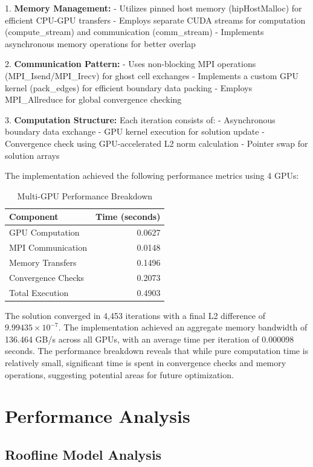 \documentclass{article}
\begin{document}
1. \textbf{Memory Management:}
   - Utilizes pinned host memory (hipHostMalloc) for efficient CPU-GPU transfers
   - Employs separate CUDA streams for computation (compute\_stream) and communication (comm\_stream)
   - Implements asynchronous memory operations for better overlap

2. \textbf{Communication Pattern:}
   - Uses non-blocking MPI operations (MPI\_Isend/MPI\_Irecv) for ghost cell exchanges
   - Implements a custom GPU kernel (pack\_edges) for efficient boundary data packing
   - Employs MPI\_Allreduce for global convergence checking

3. \textbf{Computation Structure:}
   Each iteration consists of:
   - Asynchronous boundary data exchange
   - GPU kernel execution for solution update
   - Convergence check using GPU-accelerated L2 norm calculation
   - Pointer swap for solution arrays

The implementation achieved the following performance metrics using 4 GPUs:

\begin{table}[h]
\centering
\caption{Multi-GPU Performance Breakdown}
\begin{tabular}{lr}
\toprule
Component & Time (seconds) \\
\midrule
GPU Computation & 0.0627 \\
MPI Communication & 0.0148 \\
Memory Transfers & 0.1496 \\
Convergence Checks & 0.2073 \\
\midrule
Total Execution & 0.4903 \\
\bottomrule
\end{tabular}
\label{tab:multi-gpu-breakdown}
\end{table}

The solution converged in 4,453 iterations with a final L2 difference of $9.99435 \times 10^{-7}$. The implementation achieved an aggregate memory bandwidth of 136.464 GB/s across all GPUs, with an average time per iteration of 0.000098 seconds. The performance breakdown reveals that while pure computation time is relatively small, significant time is spent in convergence checks and memory operations, suggesting potential areas for future optimization.

\section{Performance Analysis}

\subsection{Roofline Model Analysis}
\end{document}
